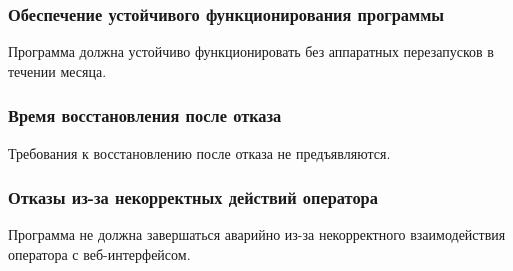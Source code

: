 \subsubsection{Обеспечение устойчивого функционирования программы}
Программа должна устойчиво функционировать без аппаратных перезапусков в течении месяца.

\subsubsection{Время восстановления после отказа}
Требования к восстановлению после отказа не предъявляются.

\subsubsection{Отказы из-за некорректных действий оператора}
Программа не должна завершаться аварийно из-за некорректного взаимодействия оператора с веб-интерфейсом.

